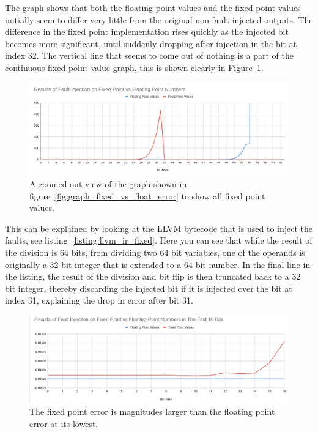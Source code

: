 The graph shows that both the floating point values and the fixed point values initially seem to differ very little from the original non-fault-injected outputs. The difference in the fixed point implementation rises quickly as the injected bit becomes more significant, until suddenly dropping after injection in the bit at index 32. The vertical line that seems to come out of nothing is a part of the continuous fixed point value graph, this is shown clearly in Figure~\ref{fig:zoomed_out_graph}.
\begin{figure}
    \centering
    \includegraphics[width=0.75\linewidth]{Images/zoomed_out_graph.png}
    \caption{A zoomed out view of the graph shown in figure~\ref{fig:graph_fixed_vs_float_error} to show all fixed point values.}
    \label{fig:zoomed_out_graph}
\end{figure}

This can be explained by looking at the LLVM bytecode that is used to inject the faults, see listing~\ref{listing:llvm_ir_fixed}. Here you can see that while the result of the division is 64 bits, from dividing two 64 bit variables, one of the operands is originally a 32 bit integer that is extended to a 64 bit number. In the final line in the listing, the result of the division and bit flip is then truncated back to a 32 bit integer, thereby discarding the injected bit if it is injected over the bit at index 31, explaining the drop in error after bit 31.

\begin{figure}[h!]
    \centering
    \includegraphics[width=\linewidth]{graph_fault_injection_fix_vs_float_first_16_bits.png}
    \caption{The fixed point error is magnitudes larger than the floating point error at its lowest.}
    \label{fig:graph_fixed_vs_float_error_first_16}
\end{figure}


